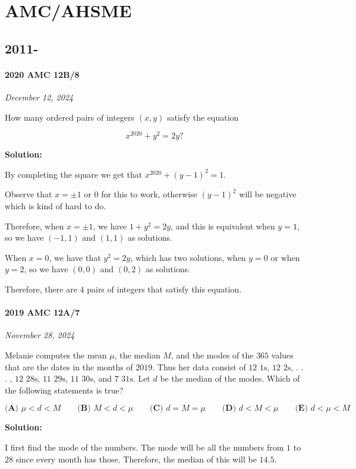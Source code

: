 \documentclass[../mathproblems.tex]{subfiles}
\begin{document}
\chapter{AMC/AHSME}
\section{2011-}
\subsubsection*{2020 AMC 12B/8}
\textit{December 12, 2024}

How many ordered pairs of integers $(x, y)$ satisfy the equation 

\[x^{2020}+y^2=2y?\]

\textbf{Solution:}

By completing the square we get that $x^{2020}+(y-1)^2=1$.

Observe that $x=\pm 1$ or $0$ for this to work, otherwise $(y-1)^2$ will be negative which is kind of hard to do. 

Therefore, when $x=\pm 1$, we have $1+y^2=2y$, and this is equivalent when $y=1$, so we have $(-1,1)$ and $(1,1)$ as solutions.

When $x=0$, we have that $y^2=2y$, which has two solutions, when $y=0$ or when $y=2$, so we have $(0,0)$ and $(0,2)$ as solutions.

Therefore, there are $\boxed{4}$ pairs of integers that satisfy this equation.

\noindent\hrulefill

\subsubsection*{2019 AMC 12A/7} 
\textit{November 28, 2024}

Melanie computes the mean $\mu$, the median $M$, and the modes of the $365$ values that are the dates in the months of $2019$. Thus her data consist of $12$ $1\text{s}$, $12$ $2\text{s}$, . . . , $12$ $28\text{s}$, $11$ $29\text{s}$, $11$ $30\text{s}$, and $7$ $31\text{s}$. Let $d$ be the median of the modes. Which of the following statements is true?

$\textbf{(A) } \mu < d < M \qquad\textbf{(B) } M < d < \mu \qquad\textbf{(C) } d = M =\mu \qquad\textbf{(D) } d < M < \mu \qquad\textbf{(E) } d < \mu < M$

\textbf{Solution:}

I first find the mode of the numbers. The mode will be all the numbers from $1$ to $28$ since every month has those. Therefore, the median of this will be $14.5$.
\end{document}
